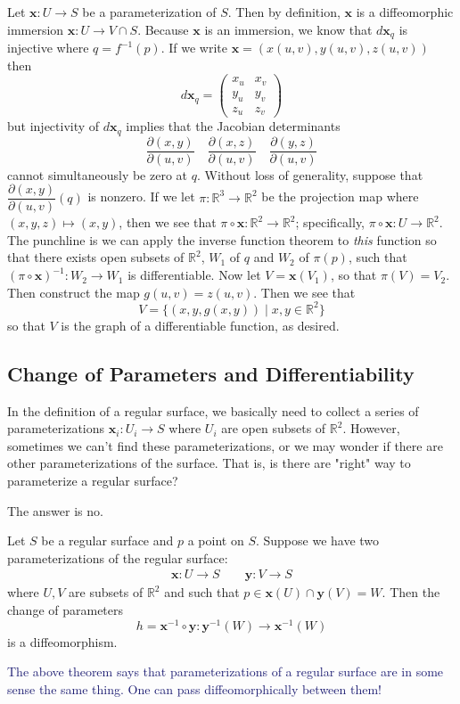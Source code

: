 \documentclass[12pt,letterpaper,boxed]{maths_v5}
\newcommand{\rr}{\mathbb{R}}
\theoremstyle{definition}
\begin{document}
\begin{prf}
Let $\bm{x}: U \to S$ be a parameterization of $S$. 
Then by definition, $\bm{x}$ is a diffeomorphic immersion $\bm{x}: U \to V \cap S$. 
Because $\bm{x}$ is an immersion, we know that $d\bm{x}_q$ is injective 
where $q = f^{-1}(p)$. If we write $\bm{x} = (x(u, v), y(u, v), z(u, v))$ then 
\[
    d\bm{x}_q = 
    \begin{pmatrix}
        x_u & x_v\\
        y_u & y_v\\
        z_u & z_v
    \end{pmatrix}    
\]
but injectivity of $d\bm{x}_q$ implies that the Jacobian determinants 
\[
    \frac{\partial(x, y)}{\partial(u, v)}
    \quad 
    \frac{\partial(x, z)}{\partial(u, v)}
    \quad 
    \frac{\partial(y, z)}{\partial(u, v)}
\]
cannot simultaneously be zero at $q$. Without loss of generality, suppose 
that $\dfrac{\partial(x, y)}{\partial(u, v)}(q)$ is nonzero. If we let $\pi: \rr^3 \to \rr^2$ 
be the projection map where $(x, y, z) \mapsto (x, y)$, then we see that 
$\pi \circ \bm{x}: \rr^2 \to \rr^2$; specifically, $\pi \circ \bm{x}: U \to \rr^2$. 
The punchline is we can apply the inverse function theorem to \textit{this} 
function so that there exists open subsets of $\rr^2$, $W_1$ 
of $q$ and $W_2$ of $\pi(p)$, such that 
$(\pi \circ \bm{x})^{-1}: W_2 \to W_1$ is differentiable. Now let 
$V = \bm{x}(V_1)$, so that $\pi(V) = V_2$. Then construct the map $g(u, v) = z(u, v)$. 
Then we see that 
\[
    V =   \{(x, y, g(x ,y)) \mid x, y \in \rr^2\}  
\]
so that $V$ is the graph of a differentiable function, as desired. 
\end{prf}

\newpage
\subsection{Change of Parameters and Differentiability}
In the definition of a regular surface, we basically need to collect a series 
of parameterizations $\bm{x}_i: U_i \to S$ where $U_i$ are open subsets 
of $\rr^2$. However, sometimes we can't find these parameterizations, or we 
may wonder if there are other parameterizations of the surface. That is, 
is there are  "right" way to parameterize a regular surface? 

The answer is no. 

\begin{thm}
    Let $S$ be a regular surface and $p$ a point on $S$. 
    Suppose we have two parameterizations of the regular surface: 
    \begin{align*}
        \bm{x}: U \to S \qquad
        \bm{y}: V \to S
    \end{align*}
    where $U, V$ are subsets of $\rr^2$ and such that $p \in \bm{x}(U)\cap\bm{y}(V) = W$. 
    Then the change of parameters 
    \[
        h = \bm{x}^{-1}\circ \bm{y}: \bm{y}^{-1}(W) \to \bm{x}^{-1}(W)
    \]
    is a diffeomorphism. 
\end{thm}
\textcolor{MidnightBlue}{The above theorem says that parameterizations of 
a regular surface are in some sense the same thing. One can pass diffeomorphically 
between them!}
\end{document}
